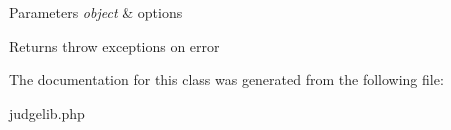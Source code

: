 \begin{DoxyParams}{Parameters}
{\em object} & options \\
\hline
\end{DoxyParams}
\begin{DoxyReturn}{Returns}
throw exceptions on error 
\end{DoxyReturn}


The documentation for this class was generated from the following file\-:\begin{DoxyCompactItemize}
\item 
judgelib.\-php\end{DoxyCompactItemize}
